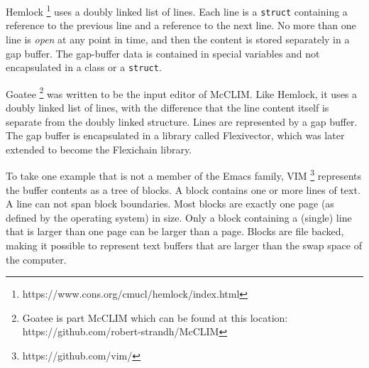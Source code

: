 Hemlock%
\footnote{https://www.cons.org/cmucl/hemlock/index.html}
uses a doubly linked list of lines.  Each line is a \texttt{struct}
containing a reference to the previous line and a reference to the
next line.  No more than one line is \emph{open} at any point in time,
and then the content is stored separately in a gap buffer.  The
gap-buffer data is contained in special variables and not encapsulated
in a class or a \texttt{struct}.

Goatee%
\footnote{Goatee is part McCLIM which can be found at this location:
https://github.com/robert-strandh/McCLIM}
was written to be the input editor of McCLIM.  Like Hemlock, it
uses a doubly linked list of lines, with the difference that the line
content itself is separate from the doubly linked structure.  Lines
are represented by a gap buffer.  The gap buffer is encapsulated in
a library called Flexivector, which was later extended to become the
Flexichain library.

To take one example that is not a member of the Emacs family, VIM%
\footnote{https://github.com/vim/} represents the buffer contents as a
tree of blocks.  A block contains one or more lines of text.  A line
can not span block boundaries.  Most blocks are exactly one page (as
defined by the operating system) in size.  Only a block containing a
(single) line that is larger than one page can be larger than a page.
Blocks are file backed, making it possible to represent text buffers
that are larger than the swap space of the computer.
